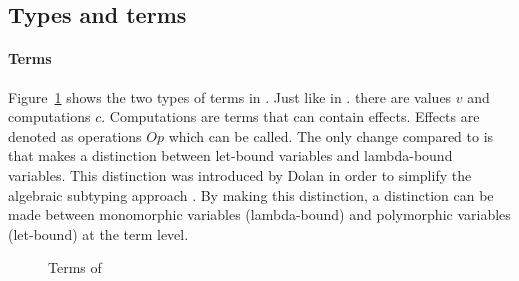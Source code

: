 \subsection{Types and terms}

\paragraph{Terms}
Figure~\ref{fig:terms:core} shows the two types of terms in \core. Just like in \eff. there are values $v$ and computations $c$. Computations are terms that can contain effects. Effects are denoted as operations $Op$ which can be called. The only change compared to \eff is that \core makes a distinction between let-bound variables and lambda-bound variables. This distinction was introduced by Dolan in order to simplify the algebraic subtyping approach \cite{mlsub}. By making this distinction, a distinction can be made between monomorphic variables (lambda-bound) and polymorphic variables (let-bound) at the term level.

\begin{figure}[!htb]
\begin{center}
\end{center}
\caption{Terms of \core}\label{fig:terms:core}
\end{figure}

